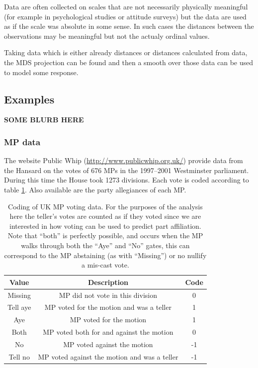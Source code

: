 Data are often collected on scales that are not necessarily physically meaningful (for example in psychological studies or attitude surveys) but the data are used as if the scale was absolute in some sense. In such cases the distances between the observations may be meaningful but not the actualy ordinal values.

Taking data which is either already distances or distances calculated from data, the MDS projection can be found and then a smooth over those data can be used to model some response.



%
\subsection{Examples}

\textbf{SOME BLURB HERE}


\subsubsection{MP data}


The website Public Whip (\url{http://www.publicwhip.org.uk/}) provide data from the Hansard on the votes of 676 MPs in the 1997--2001 Westminster parliament. During this time the House took 1273 divisions. Each vote is coded according to table \ref{voting-code}. Also available are the party allegiances of each MP. 


\begin{table}  
\begin{centering}
\begin{tabular}{ccc}
    Value & Description & Code \\ 
    \hline
    Missing & MP did not vote in this division & 0 \\ 
    Tell aye & MP voted for the motion and was a teller & 1 \\ 
    Aye & MP voted for the motion & 1 \\ 
    Both & MP voted both for  and against the motion & 0 \\ 
    No & MP voted against the motion & -1 \\ 
    Tell no & MP voted against the motion and was a teller & -1 \\ 
  \end{tabular}
\caption{Coding of UK MP voting data. For the purposes of the analysis here the teller's votes are counted as if they voted since we are interested in how voting can be used to predict part affiliation. Note that ``both'' is perfectly possible, and occurs when the MP walks through both the ``Aye'' and ``No'' gates, this can correspond to the MP abstaining (as with ``Missing'') or no nullify a mis-cast vote.}
\end{centering}
\label{voting-code}
\end{table}


